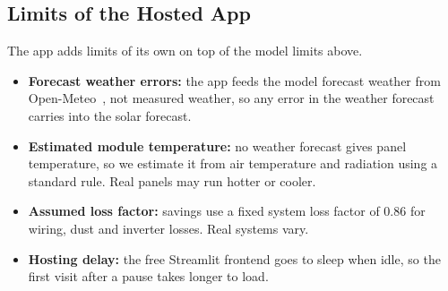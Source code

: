 \subsection{Limits of the Hosted App}
The app adds limits of its own on top of the model limits above.
\begin{itemize}
  \item \textbf{Forecast weather errors:} the app feeds the model forecast
        weather from Open-Meteo~\cite{openmeteo}, not measured weather, so
        any error in the weather forecast carries into the solar forecast.
  \item \textbf{Estimated module temperature:} no weather forecast gives
        panel temperature, so we estimate it from air temperature and
        radiation using a standard rule. Real panels may run hotter or
        cooler.
  \item \textbf{Assumed loss factor:} savings use a fixed system loss factor
        of 0.86 for wiring, dust and inverter losses. Real systems vary.
    \item \textbf{Hosting delay:} the free Streamlit frontend goes to sleep
        when idle, so the first visit after a pause takes longer to load.
\end{itemize}